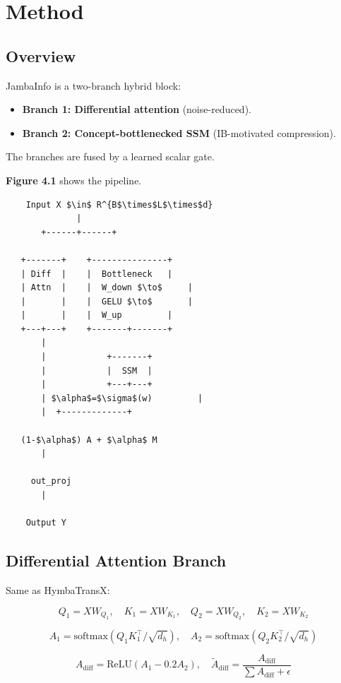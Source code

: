 \section{Method}

\subsection{Overview}

JambaInfo is a two-branch hybrid block:

\begin{itemize}
\item \textbf{Branch 1: Differential attention} (noise-reduced).
\item \textbf{Branch 2: Concept-bottlenecked SSM} (IB-motivated compression).

\end{itemize}
The branches are fused by a learned scalar gate.

\textbf{Figure 4.1} shows the pipeline.

\begin{lstlisting}
    Input X $\in$ R^{B$\times$L$\times$d}
              |
       +------+------+
                      
   +-------+    +---------------+
   | Diff  |    |  Bottleneck   |
   | Attn  |    |  W_down $\to$     |
   |       |    |  GELU $\to$       |
   |       |    |  W_up         |
   +---+---+    +-------+-------+
       |                 
       |            +-------+
       |            |  SSM  |
       |            +---+---+
       | $\alpha$=$\sigma$(w)         |
       |  +-------------+
           
   (1-$\alpha$) A + $\alpha$ M
       |
        
     out_proj
       |
        
    Output Y
\end{lstlisting}

\subsection{Differential Attention Branch}

Same as HymbaTransX:

\[
Q_1 = X W_{Q_1}, \quad K_1 = X W_{K_1}, \quad
Q_2 = X W_{Q_2}, \quad K_2 = X W_{K_2}
\tag{4.1}
\]

\[
A_1 = \text{softmax}(Q_1 K_1^\top / \sqrt{d_h}), \quad
A_2 = \text{softmax}(Q_2 K_2^\top / \sqrt{d_h})
\tag{4.2}
\]

\[
A_\text{diff} = \text{ReLU}(A_1 - 0.2 A_2), \quad
\tilde{A}_\text{diff} = \frac{A_\text{diff}}{\sum A_\text{diff} + \epsilon}
\tag{4.3}
\]

